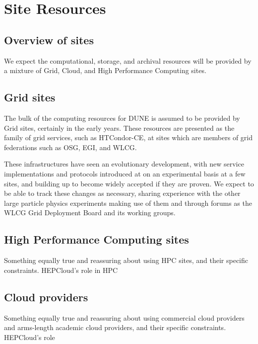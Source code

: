 \documentclass[../main-v1.tex]{subfiles}
\begin{document}
\chapter{Site Resources }
\label{ch:sites}


\section{Overview of sites}
\label{sec:sites:overview}

We expect the computational, storage, and archival resources will be provided by a mixture of Grid, Cloud, and High Performance Computing sites. 

\section{Grid sites}
\label{sec:sites:grid}  %

The bulk of the computing resources for DUNE is assumed to be provided by Grid sites, certainly in the early years. These resources are presented as the family of grid services, such as HTCondor-CE, at sites which are members of grid federations such as OSG, EGI, and WLCG.

These infrastructures have seen an evolutionary development, with new service implementations and protocols introduced at on an experimental basis at a few sites, and building up to become widely accepted if they are proven. We expect to be able to track these changes as necessary, sharing experience with the other large particle physics experiments making use of them and through forums as the WLCG Grid Deployment Board and its working groups.

\section{High Performance Computing sites}
\label{sec:sites:hpc}

Something equally true and reassuring about using HPC sites, and their specific constraints. HEPCloud's role in HPC

\section{Cloud providers}
\label{sec:sites:cloud}

Something equally true and reassuring about using commercial cloud providers and arms-length academic cloud providers, and their specific constraints. HEPCloud's role
\end{document}
